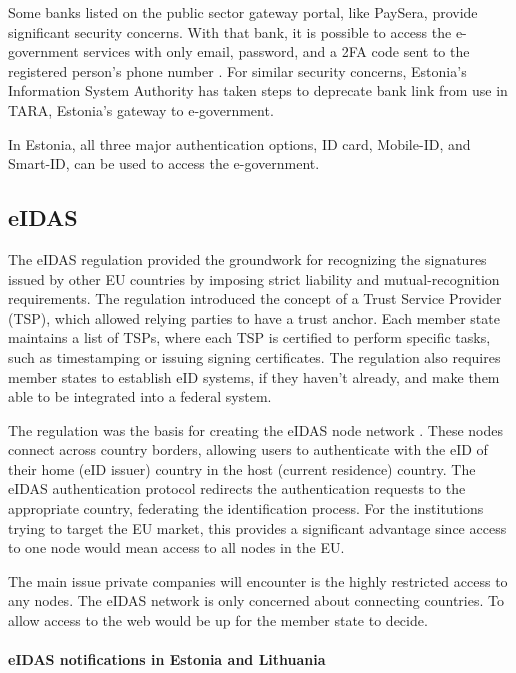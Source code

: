 Some banks listed on the public sector gateway portal, like PaySera, provide significant security concerns. With that bank, it is possible to access the e-government services with only email, password, and a 2FA code sent to the registered person's phone number . For similar security concerns, Estonia's Information System Authority has taken steps to deprecate bank link \cite{ria-deprecates-bank-link} from use in TARA, Estonia's gateway to e-government.

In Estonia, all three major authentication options, ID card, Mobile-ID, and Smart-ID, can be used to access the e-government.

\subsection{eIDAS}

The eIDAS regulation \cite{eulaw-eidas} provided the groundwork for recognizing the signatures issued by other EU countries by imposing strict liability and mutual-recognition requirements. The regulation introduced the concept of a Trust Service Provider (TSP), which allowed relying parties to have a trust anchor. Each member state maintains a list of TSPs, where each TSP is certified to perform specific tasks, such as timestamping or issuing signing certificates. The regulation also requires member states to establish eID systems, if they haven't already, and make them able to be integrated into a federal system.

The regulation was the basis for creating the eIDAS node network \cite{carretero2018federated}. These nodes connect across country borders, allowing users to authenticate with the eID of their home (eID issuer) country in the host (current residence) country. The eIDAS authentication protocol redirects the authentication requests to the appropriate country, federating the identification process. For the institutions trying to target the EU market, this provides a significant advantage since access to one node would mean access to all nodes in the EU.

The main issue private companies will encounter is the highly restricted access to any nodes. The eIDAS network is only concerned about connecting countries. To allow access to the web would be up for the member state to decide.

\paragraph{eIDAS notifications in Estonia and Lithuania}

